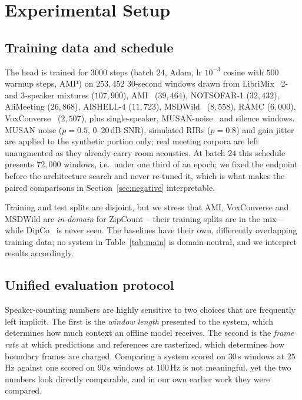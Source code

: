 \documentclass[journal]{IEEEtran}
\newcommand{\sys}{ZipCount}
\begin{document}
\section{Experimental Setup}

\subsection{Training data and schedule}
The head is trained for $3000$ steps (batch $24$, Adam, lr $10^{-3}$ cosine
with $500$ warmup steps, AMP) on $253{,}452$ $30$-second windows drawn from
LibriMix~\cite{cosentino2020librimix} 2- and 3-speaker mixtures
($107{,}900$), AMI~\cite{carletta2005ami} ($39{,}464$), NOTSOFAR-1
($32{,}432$), AliMeeting ($26{,}868$), AISHELL-4 ($11{,}723$),
MSDWild~\cite{liu2022msdwild} ($8{,}558$), RAMC ($6{,}000$),
VoxConverse~\cite{chung2020voxconverse} ($2{,}507$), plus single-speaker,
MUSAN-noise~\cite{snyder2015musan} and silence windows. MUSAN noise
($p\!=\!0.5$, $0$--$20$\,dB SNR), simulated RIRs ($p\!=\!0.8$) and gain
jitter are applied to the synthetic portion only; real meeting corpora are
left unaugmented as they already carry room acoustics. At batch $24$ this
schedule presents $72{,}000$ windows, i.e.\ under one third of an epoch;
we fixed the endpoint before the architecture search and never re-tuned it,
which is what makes the paired comparisons in Section~\ref{sec:negative}
interpretable.

Training and test splits are disjoint, but we stress that AMI, VoxConverse
and MSDWild are \emph{in-domain} for \sys{} -- their training splits are in
the mix -- while DipCo~\cite{vansegbroeck2020dipco} is never seen. The
baselines have their own, differently overlapping training data; no system
in Table~\ref{tab:main} is domain-neutral, and we interpret results
accordingly.

\subsection{Unified evaluation protocol}
\label{sec:protocol}
Speaker-counting numbers are highly sensitive to two choices that are
frequently left implicit. The first is the \emph{window length} presented to
the system, which determines how much context an offline model receives. The
second is the \emph{frame rate} at which predictions and references are
rasterized, which determines how boundary frames are charged. Comparing a
system scored on $30$\,s windows at $25$\,Hz against one scored on $90$\,s
windows at $100$\,Hz is not meaningful, yet the two numbers look directly
comparable, and in our own earlier work they were compared.
\end{document}
